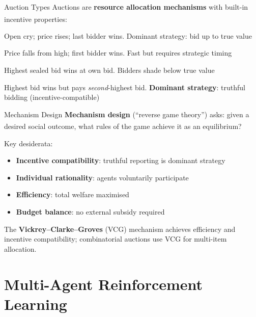 \begin{v3topic}{Auction Types}
    Auctions are \textbf{resource allocation mechanisms} with built-in incentive
    properties:\textsuperscript{\cite[][Ch.~11]{shohamMultiagentSystemsAlgorithmic2009}}
    \begin{description}[leftmargin=0.6cm, labelindent=0pt]
        \item[\textbf{English (ascending)}] Open cry; price rises; last bidder wins.
              Dominant strategy: bid up to true value
        \item[\textbf{Dutch (descending)}] Price falls from high; first bidder wins.
              Fast but requires strategic timing
        \item[\textbf{First-price sealed-bid}] Highest sealed bid wins at own bid.
              Bidders shade below true value
        \item[\textbf{Vickrey (second-price sealed-bid)}] Highest bid wins but pays
              \emph{second}-highest bid. \textbf{Dominant strategy}: truthful bidding
              (incentive-compatible)
    \end{description}

\end{v3topic}
\begin{v3topic}{Mechanism Design}
    \textbf{Mechanism design} (``reverse game theory'') asks: given a desired
    social outcome, what rules of the game achieve it as an
    equilibrium?\textsuperscript{\cite[][p.~280]{shohamMultiagentSystemsAlgorithmic2009}}

    Key desiderata:
    \begin{itemize}
        \item \textbf{Incentive compatibility}: truthful reporting is dominant strategy
        \item \textbf{Individual rationality}: agents voluntarily participate
        \item \textbf{Efficiency}: total welfare maximised
        \item \textbf{Budget balance}: no external subsidy required
    \end{itemize}
    The \textbf{Vickrey--Clarke--Groves} (VCG) mechanism achieves
    efficiency and incentive compatibility; combinatorial auctions use VCG
    for multi-item allocation.

\end{v3topic}

\section{Multi-Agent Reinforcement Learning}

